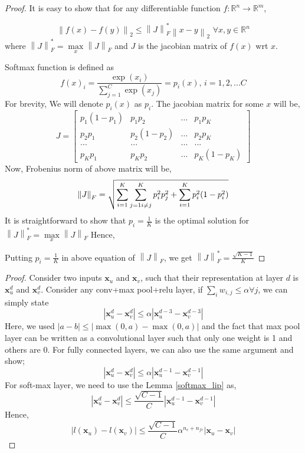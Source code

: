 \documentclass{article}
\begin{document}
\begin{proof}
It is easy to show that for any differentiable function $f:\mathbb{R}^n\rightarrow\mathbb{R}^m$,

\[
\left \|f(x)-f(y)\right \|_2 \leq \left \|J\right \|^*_F \left \|x-y\right\|_2 \, \, \forall x,y\in\mathbb{R}^n
\]
where $\left \|J\right \|^*_F = \max\limits_{x} \left \|J\right \|_F$ and $J$ is the jacobian matrix of $f(x)$ wrt $x$.

Softmax function is defined as
\[
f(x)_i = \frac{\exp(x_i)}{\sum\limits_{j=1}^{C}\exp(x_j)} = p_i(x), \, i={1,2,...C}
\]
For brevity, We will denote $p_i(x)$ as $p_i$. The jacobian matrix for some $x$ will be,
\[
J = \begin{bmatrix} p_1(1-p_1) & p_1p_2  & ... & p_1p_K \\
p_2p_1 & p_2(1-p_2)  & ...  & p_2p_K \\
... & ... & ... & ...  \\
p_{K}p_{1} & p_{K}p_{2}  & ...  & p_{K}(1-p_{K})
\end{bmatrix}
\]
Now, Frobenius norm of above matrix will be,
\[
\left \| J \right \|_F = \sqrt{\sum\limits_{i=1}^{K}\sum\limits_{j=1 \\ i\neq j}^{K}p_{i}^{2}p_{j}^{2} + \sum\limits_{i=1}^{K} p_i^2(1-p_i^2)}
\]
It is straightforward to show that $p_i = \frac{1}{K}$ is the optimal solution for $\left \| J \right \|^{*}_F = \max\limits_{x}\left \| J \right \|_F $ Hence,


Putting $p_i = \frac{1}{K}$ in above equation of $\left \| J \right \|_F$, we get $\left \| J \right \|^{*}_F = \frac{\sqrt{K-1}}{K}$

\end{proof}


\begin{proof}
Consider two inputs $\mathbf{x}_u$ and $\mathbf{x}_v$, such that their representation at layer $d$ is $\mathbf{x}_u^d$ and $\mathbf{x}_v^d$. Consider any conv+max pool+relu layer, if $\sum_i w_{i,j} \leq \alpha \forall j$, we can simply state
\[
|\mathbf{x}_u^d - \mathbf{x}_v^d| \leq  \alpha |\mathbf{x}_u^{d-3} - \mathbf{x}_v^{d-3}|
\] 
Here, we used $|a-b| \leq |\max(0, a) - \max(0,a)|$ and the fact that max pool layer can be written as a convolutional layer such that only one weight is 1 and others are 0. For fully connected layers, we can also use the same argument and show;
\[
|\mathbf{x}_u^d - \mathbf{x}_v^d| \leq  \alpha |\mathbf{x}_u^{d-1} - \mathbf{x}_v^{d-1}|
\] 
For soft-max layer, we need to use the Lemma \ref{softmax_lip} as,
\[
|\mathbf{x}_u^d - \mathbf{x}_v^d| \leq  \frac{\sqrt{C-1}}{C} |\mathbf{x}_u^{d-1} - \mathbf{x}_v^{d-1}|
\] 
Hence,
\[
|l(\mathbf{x}_u) - l(\mathbf{x}_v)| \leq   \frac{\sqrt{C-1}}{C} \alpha^{n_c+n_{fc}}  |\mathbf{x}_u-\mathbf{x}_v|
\]
\end{proof}
\end{document}
